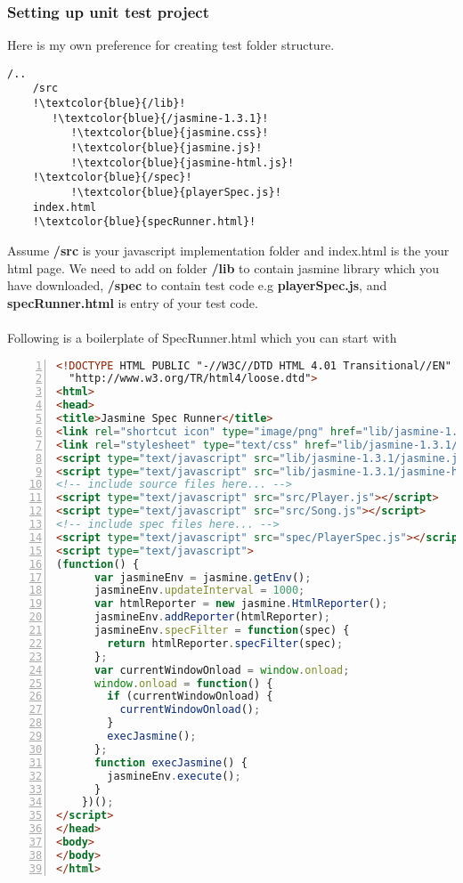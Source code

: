 \documentclass[a4paper,11pt]{article}
\begin{document}
	\subsubsection{ Setting up unit test project }
	Here is my own preference for creating test folder structure.
           \begin{lstlisting}[label=some-code,caption=Folder Structure Suggestion, escapechar=!]
	/..
	/src 
	!\textcolor{blue}{/lib}!
	   !\textcolor{blue}{/jasmine-1.3.1}!
	      !\textcolor{blue}{jasmine.css}!	
	      !\textcolor{blue}{jasmine.js}!	
	      !\textcolor{blue}{jasmine-html.js}!	
	!\textcolor{blue}{/spec}!
	      !\textcolor{blue}{playerSpec.js}!	
	index.html
	!\textcolor{blue}{specRunner.html}!
           \end{lstlisting}
	Assume \textbf{/src} is your javascript implementation folder and index.html is the your html page. We need to add on folder \textbf{/lib} to contain jasmine library which you have downloaded, \textbf{/spec} to contain test code e.g \textbf{playerSpec.js}, and \textbf{specRunner.html} is entry of your test code.\\\\
	\pagebreak
	Following is a boilerplate of SpecRunner.html which you can start with
           \begin{lstlisting}[label=some-code,caption=SpecRunner.html boilerplate, language=HTML, keywordstyle=\color{blue}, style = customhtml, numbers=left]
<!DOCTYPE HTML PUBLIC "-//W3C//DTD HTML 4.01 Transitional//EN"
  "http://www.w3.org/TR/html4/loose.dtd">
<html>
<head>
<title>Jasmine Spec Runner</title>
<link rel="shortcut icon" type="image/png" href="lib/jasmine-1.3.1/jasmine_favicon.png">
<link rel="stylesheet" type="text/css" href="lib/jasmine-1.3.1/jasmine.css">
<script type="text/javascript" src="lib/jasmine-1.3.1/jasmine.js"></script>
<script type="text/javascript" src="lib/jasmine-1.3.1/jasmine-html.js"></script>
<!-- include source files here... -->
<script type="text/javascript" src="src/Player.js"></script>
<script type="text/javascript" src="src/Song.js"></script>
<!-- include spec files here... -->
<script type="text/javascript" src="spec/PlayerSpec.js"></script>
<script type="text/javascript">
(function() {
      var jasmineEnv = jasmine.getEnv();
      jasmineEnv.updateInterval = 1000;
      var htmlReporter = new jasmine.HtmlReporter();
      jasmineEnv.addReporter(htmlReporter);
      jasmineEnv.specFilter = function(spec) {
        return htmlReporter.specFilter(spec);
      };
      var currentWindowOnload = window.onload;
      window.onload = function() {
        if (currentWindowOnload) {
          currentWindowOnload();
        }
        execJasmine();
      };
      function execJasmine() {
        jasmineEnv.execute();
      }
    })();
</script>
</head>
<body>
</body>
</html>
           \end{lstlisting}
\end{document}
